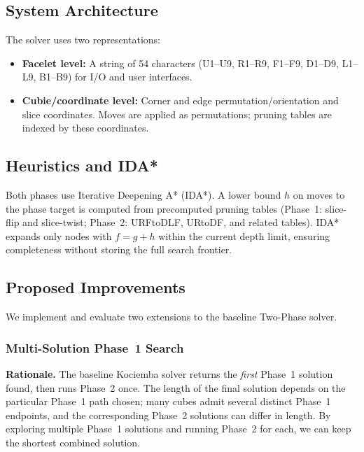 \documentclass[10pt,twocolumn,a4paper]{article}
\begin{document}
\subsection{System Architecture}
The solver uses two representations:
\begin{itemize}
  \item \textbf{Facelet level:} A string of 54 characters (U1--U9, R1--R9, F1--F9, D1--D9, L1--L9, B1--B9) for I/O and user interfaces.
  \item \textbf{Cubie/coordinate level:} Corner and edge permutation/orientation and slice coordinates. Moves are applied as permutations; pruning tables are indexed by these coordinates.
\end{itemize}

\subsection{Heuristics and IDA*}
Both phases use Iterative Deepening A* (IDA*). A lower bound $h$ on moves to the phase target is computed from precomputed pruning tables (Phase~1: slice-flip and slice-twist; Phase~2: URFtoDLF, URtoDF, and related tables). IDA* expands only nodes with $f = g + h$ within the current depth limit, ensuring completeness without storing the full search frontier.

\subsection{Proposed Improvements}
\label{sec:improvements}

We implement and evaluate two extensions to the baseline Two-Phase solver.

\subsubsection{Multi-Solution Phase~1 Search}
\label{sec:multi-phase1}

\textbf{Rationale.} The baseline Kociemba solver returns the \emph{first} Phase~1 solution found, then runs Phase~2 once. The length of the final solution depends on the particular Phase~1 path chosen; many cubes admit several distinct Phase~1 endpoints, and the corresponding Phase~2 solutions can differ in length. By exploring multiple Phase~1 solutions and running Phase~2 for each, we can keep the shortest combined solution.
\end{document}
